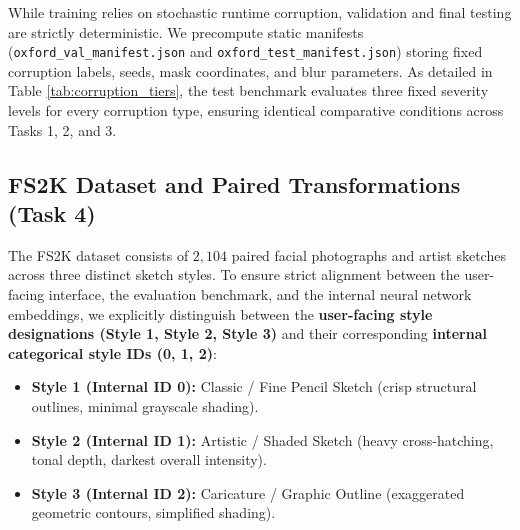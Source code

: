 \documentclass[conference]{IEEEtran}
\begin{document}
\begin{table}[!t]
\centering
\caption{Deterministic Benchmark Corruption Tiers (Test Set: $N=3,669$).}
\label{tab:corruption_tiers}
\end{table}

While training relies on stochastic runtime corruption, validation and final testing are strictly deterministic. We precompute static manifests (\texttt{oxford\_val\_manifest.json} and \texttt{oxford\_test\_manifest.json}) storing fixed corruption labels, seeds, mask coordinates, and blur parameters. As detailed in Table \ref{tab:corruption_tiers}, the test benchmark evaluates three fixed severity levels for every corruption type, ensuring identical comparative conditions across Tasks 1, 2, and 3.

\subsection{FS2K Dataset and Paired Transformations (Task 4)}
The FS2K dataset \cite{fan2022facial} consists of $2,104$ paired facial photographs and artist sketches across three distinct sketch styles. To ensure strict alignment between the user-facing interface, the evaluation benchmark, and the internal neural network embeddings, we explicitly distinguish between the \textbf{user-facing style designations (Style 1, Style 2, Style 3)} and their corresponding \textbf{internal categorical style IDs (0, 1, 2)}:
\begin{itemize}
    \item \textbf{Style 1 (Internal ID 0):} Classic / Fine Pencil Sketch (crisp structural outlines, minimal grayscale shading).
    \item \textbf{Style 2 (Internal ID 1):} Artistic / Shaded Sketch (heavy cross-hatching, tonal depth, darkest overall intensity).
    \item \textbf{Style 3 (Internal ID 2):} Caricature / Graphic Outline (exaggerated geometric contours, simplified shading).
\end{itemize}
\end{document}
